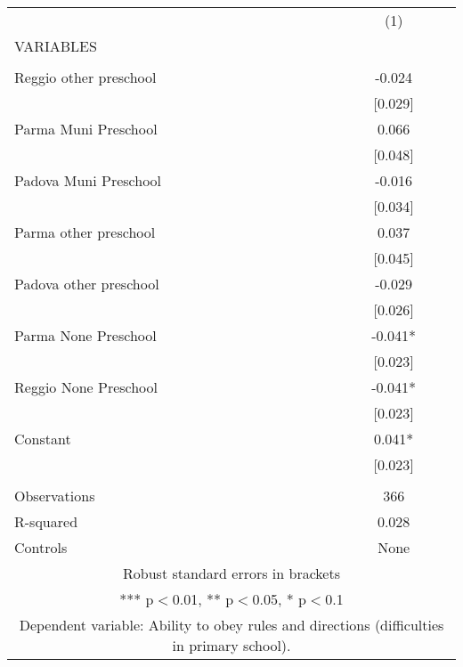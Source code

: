 \begin{tabular}{lc} \hline
 & (1) \\
VARIABLES &  \\ \hline
 &  \\
Reggio other preschool & -0.024 \\
 & [0.029] \\
Parma Muni Preschool & 0.066 \\
 & [0.048] \\
Padova Muni Preschool & -0.016 \\
 & [0.034] \\
Parma other preschool & 0.037 \\
 & [0.045] \\
Padova other preschool & -0.029 \\
 & [0.026] \\
Parma None Preschool & -0.041* \\
 & [0.023] \\
Reggio None Preschool & -0.041* \\
 & [0.023] \\
Constant & 0.041* \\
 & [0.023] \\
 &  \\
Observations & 366 \\
R-squared & 0.028 \\
 Controls & None \\ \hline
\multicolumn{2}{c}{ Robust standard errors in brackets} \\
\multicolumn{2}{c}{ *** p$<$0.01, ** p$<$0.05, * p$<$0.1} \\
\multicolumn{2}{c}{ Dependent variable: Ability to obey rules and directions (difficulties in primary school).} \\
\end{tabular}
